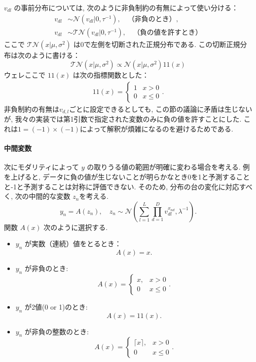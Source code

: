 \documentclass[a4paper,12ptc]{jsarticle} %
\newcommand{\normal}{\mathcal{N}}
\newcommand{\truncnorm}{\mathcal{TN}}
\newcommand{\one}{1\!\!1}
\begin{document}
$v_{dl}$ の事前分布については, 次のように非負制約の有無によって使い分ける：
\begin{align}
v_{dl} & \sim \normal(v_{dl} | 0,\tau^{-1}), \quad  \mbox{（非負のとき）} \label{eq_prior1}, \\
v_{dl} & \sim \truncnorm(v_{dl} | 0, \tau^{-1}), \quad  \mbox{（負の値を許すとき）} \label{eq_prior2}
\end{align}
ここで $\truncnorm(x | \mu, \sigma^2)$ は0で左側を切断された正規分布である.
この切断正規分布は次のように書ける：
\begin{equation*}
   \truncnorm(x | \mu, \sigma^2) \propto    \normal(x | \mu, \sigma^2) \one(x) 
\end{equation*}
ウェレここで $\one(x)$ は次の指標関数とした：
\begin{align*}
    \one(x)=\begin{cases} 1 & x>0\\
    0 &x \leq 0\end{cases}.
\end{align*}
非負制約の有無は$v_{d,l}$ごとに設定できるとしても, この節の議論に矛盾は生じないが, 我々の実装では第1引数で指定された変数のみに負の値を許すことにした. これは$1=(-1)\times(-1)$によって解釈が煩雑になるのを避けるためである.

\paragraph{中間変数}
次にモダリティによって $y$ の取りうる値の範囲が明確に変わる場合を考える.
例を上げると, データに負の値が生じないことが明らかなとき0を1と予測することと-1と予測することは対称に評価できない.
そのため, 分布の台の変化に対応すべく, 次の中間的な変数 $z_n$を考える.
\begin{equation}
y_n = A(z_n), \quad z_n \sim \mathcal{N}\left(\sum_{l=1}^L \prod_{d=1}^Dv_{dl}^{x_{nd}}, \lambda^{-1}\right).
\end{equation}
関数 $A(x)$ 次のように選択する.
\begin{itemize}
\item $y_n$ が実数（連続）値をとるとき： 
$$
A(x)=x.
$$
\item $y_n$ が非負のとき:
$$
A(x)=\begin{cases}x, &x>0\\0 &x\leq 0\end{cases}.
$$
\item
$y_n$ が2値(0 or 1)のとき:
$$
A(x)=\one(x).
$$
\item
$y_n$ が非負の整数のとき:
$$
A(x)=\begin{cases}\lceil x\rceil, & x>0\\0 &x\leq 0\end{cases}.
$$
\end{itemize}
\end{document}
